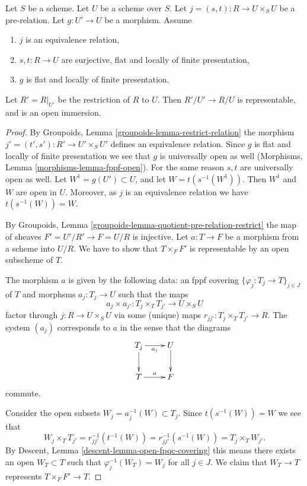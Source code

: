 \begin{lemma}
\label{lemma-finding-opens}
Let $S$ be a scheme.
Let $U$ be a scheme over $S$.
Let $j = (s, t) : R \to U \times_S U$ be a pre-relation.
Let $g : U' \to U$ be a morphism.
Assume
\begin{enumerate}
\item $j$ is an equivalence relation,
\item $s, t : R \to U$ are surjective, flat and
locally of finite presentation,
\item $g$ is flat and locally of finite presentation.
\end{enumerate}
Let $R' = R|_{U'}$ be the restriction of $R$ to $U$. Then
$R'/U' \to R/U$ is representable, and is an open immersion.
\end{lemma}

\begin{proof}
By Groupoids, Lemma \ref{groupoids-lemma-restrict-relation}
the morphism $j' = (t', s') : R' \to U' \times_S U'$
defines an equivalence relation. Since $g$ is flat and locally of
finite presentation we see that $g$ is universally open as well
(Morphisms, Lemma \ref{morphisms-lemma-fppf-open}).
For the same reason $s, t$ are universally open as well.
Let $W^1 = g(U') \subset U$, and let $W = t(s^{-1}(W^1))$.
Then $W^1$ and $W$ are open in $U$. Moreover, as $j$ is an
equivalence relation we have $t(s^{-1}(W)) = W$.

\medskip\noindent
By Groupoids, Lemma \ref{groupoids-lemma-quotient-pre-relation-restrict}
the map of sheaves $F' = U'/R' \to F = U/R$ is injective.
Let $a : T \to F$ be a morphism from a scheme into $U/R$.
We have to show that $T \times_F F'$ is representable
by an open subscheme of $T$.

\medskip\noindent
The morphism $a$ is given by the following data:
an fppf covering $\{\varphi_j : T_j \to T\}_{j \in J}$ of $T$ and
morphsms $a_j : T_j \to U$ such that the maps
$$
a_j \times a_{j'} :
T_j \times_T T_{j'}
\longrightarrow
U \times_S U
$$
factor through $j : R \to U \times_S U$ via some (unique) maps
$r_{jj'} : T_j \times_T T_{j'} \to R$. The system
$(a_j)$ corresponds to $a$ in the sense that the diagrams
$$
\xymatrix{
T_j \ar[r]_{a_j} \ar[d] & U \ar[d] \\
T \ar[r]^a & F
}
$$
commute.

\medskip\noindent
Consider the open subsets $W_j = a_j^{-1}(W) \subset T_j$.
Since $t(s^{-1}(W)) = W$ we see that
$$
W_j \times_T T_{j'} =
r_{jj'}^{-1}(t^{-1}(W)) = r_{jj'}^{-1}(s^{-1}(W)) =
T_j \times_T W_{j'}.
$$
By
Descent, Lemma \ref{descent-lemma-open-fpqc-covering}
this means there exists an open
$W_T \subset T$ such that $\varphi_j^{-1}(W_T) = W_j$ for all $j \in J$.
We claim that $W_T \to T$ represents $T \times_F F' \to T$.


\end{proof}
